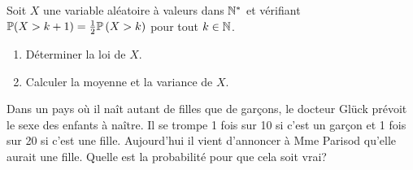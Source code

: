 \documentclass[a4paper]{tp_um}
\begin{document}
\exo{} Soit $X$ une variable aléatoire à valeurs dans $\N^{*}$ et vérifiant $\P(X > k+1) = \frac 1 2 \P\left( X > k \right)$ pour tout $k\in\N$. 
\begin{enumerate}
    \item Déterminer la loi de $X$.
\newpage


    \item Calculer la moyenne et la variance de $X$.
     \vspace*{10cm}

\end{enumerate} %


\exo{} Dans un pays où il naît autant de filles que de garçons, le docteur Glück prévoit le sexe des enfants à naître. Il se trompe 1 fois sur 10 si c'est un garçon et 1 fois sur 20 si c'est une fille. Aujourd'hui il vient d'annoncer à Mme Parisod qu'elle aurait une fille. Quelle est la probabilité pour que cela soit vrai?  %
\vspace*{8cm}


\end{document}
